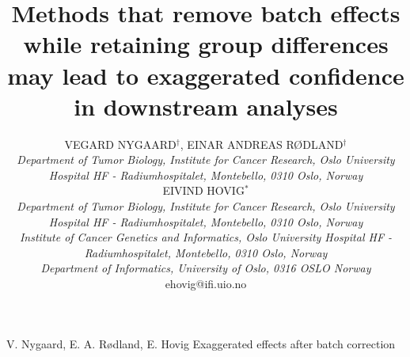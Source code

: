 \documentclass[oupdraft]{bio}
\begin{document}

\title{Methods that remove batch effects while retaining group differences may lead
to exaggerated confidence in downstream analyses
}

\renewcommand{\thefootnote}{\textdagger}

\author{VEGARD NYGAARD$^\dagger$, EINAR ANDREAS RØDLAND$^\dagger$\\[4pt]
\textit{Department of Tumor Biology,
Institute for Cancer Research,
Oslo University Hospital HF - Radiumhospitalet,
Montebello,
0310 Oslo,
Norway}
\\[8pt]
EIVIND HOVIG$^\ast$\\[4pt]
\textit{Department of Tumor Biology,
Institute for Cancer Research,
Oslo University Hospital HF - Radiumhospitalet,
Montebello,
0310 Oslo,
Norway}
\\[2pt]
\textit{Institute of Cancer Genetics and Informatics, Oslo University Hospital HF - Radiumhospitalet,
Montebello, 
0310 Oslo,
Norway}
\\[2pt]
\textit{Department of Informatics, University of Oslo, 
0316 OSLO
Norway}
\\[2pt]
{ehovig@ifi.uio.no}}

\markboth%
{V. Nygaard, E. A. Rødland, E. Hovig}
{Exaggerated effects after batch correction}


\maketitle


\end{document}
